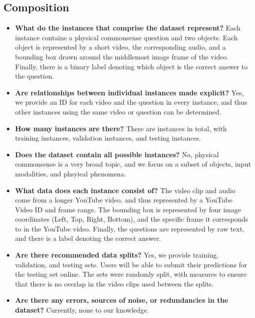 \documentclass[runningheads]{llncs}
\begin{document}
\subsection{Composition}

\begin{itemize}
\item \textbf{What do the instances that comprise the dataset represent?} Each instance contains a physical commonsense question and two objects. Each object is represented by a short video, the corresponding audio, and a bounding box drawn around the middlemost image frame of the video. Finally, there is a binary label denoting which object is the correct answer to the question. 

\item \textbf{Are relationships between individual instances made explicit?} Yes, we provide an ID for each video and the question in every instance, and thus other instances using the same video or question can be determined. 

\item \textbf{How many instances are there?} There are  instances in total, with  training instances,  validation instances, and  testing instances. 

\item \textbf{Does the dataset contain all possible instances?} No, physical commonsense is a very broad topic, and we focus on a subset of objects, input modalities, and phsyical phenomena. 

\item \textbf{What data does each instance consist of?} The video clip and audio come from a longer YouTube video, and thus represented by a YouTube Video ID and frame range. The bounding box is represented by four image coordinates (Left, Top, Right, Bottom), and the specific frame it corresponds to in the YouTube video. Finally, the questions are represented by raw text, and there is a label denoting the correct answer. 

\item \textbf{Are there recommended data splits?} Yes, we provide training, validation, and testing sets. Users will be able to submit their predictions for the testing set online. The sets were randomly split, with measures to ensure that there is no overlap in the video clips used between the splits. 

\item \textbf{Are there any errors, sources of noise, or redundancies in the dataset?} Currently, none to our knowledge. 


\end{itemize}
\end{document}
